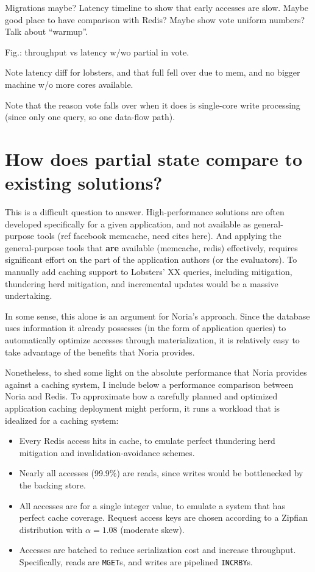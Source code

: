 Migrations maybe? Latency timeline to show that early accesses are slow.
Maybe good place to have comparison with Redis? Maybe show vote uniform
numbers? Talk about ``warmup''.

Fig.: throughput vs latency w/wo partial in vote.

Note latency diff for lobsters, and that full fell over due to mem, and
no bigger machine w/o more cores available.

Note that the reason vote falls over when it does is single-core write
processing (since only one query, so one data-flow path).

\section{How does partial state compare to existing solutions?}
\label{s:eval:existing}

This is a difficult question to answer. High-performance solutions are
often developed specifically for a given application, and not available
as general-purpose tools (ref facebook memcache, need cites here).
And applying the general-purpose tools that \textbf{are} available (memcache,
redis) effectively, requires significant effort on the part of the
application authors (or the evaluators). To manually add caching support
to Lobsters' XX queries, including mitigation, thundering herd
mitigation, and incremental updates would be a massive undertaking.

In some sense, this alone is an argument for Noria's approach. Since the
database uses information it already possesses (in the form of
application queries) to automatically optimize accesses through
materialization, it is relatively easy to take advantage of the benefits
that Noria provides.

Nonetheless, to shed some light on the absolute performance that Noria
provides against a caching system, I include below a performance
comparison between Noria and Redis. To approximate how a carefully
planned and optimized application caching deployment might perform, it
runs a workload that is idealized for a caching system:

\begin{itemize}
 \item Every Redis access hits in cache, to emulate perfect thundering herd
   mitigation and invalidation-avoidance schemes.
 \item Nearly all accesses (99.9\%) are reads, since writes would be
   bottlenecked by the backing store.
 \item All accesses are for a single integer value, to emulate a system that has
   perfect cache coverage. Request access keys are chosen according to a Zipfian
    distribution with $\alpha = 1.08$ (moderate skew).
 \item Accesses are batched to reduce serialization cost and increase
   throughput. Specifically, reads are \texttt{MGET}s, and writes are pipelined
    \texttt{INCRBY}s.
\end{itemize}

